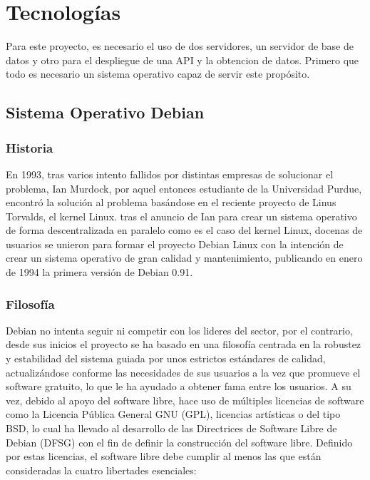 \chapter[Tecnologías]{Tecnologías}
\label{Chap3}

Para este proyecto, es necesario el uso de dos servidores, un servidor de base de datos y otro para el despliegue de una API y la obtencion de datos.\newline
\newline
Primero que todo es necesario un sistema operativo capaz de servir este propósito.

\section{Sistema Operativo Debian}

\subsection{Historia}
En 1993, tras varios intento fallidos por distintas empresas de solucionar el problema, Ian Murdock, por aquel entonces estudiante de la Universidad Purdue, encontró la solución al problema basándose en el reciente proyecto de Linus Torvalds, el kernel Linux. tras el anuncio de Ian para crear un sistema operativo de forma descentralizada en paralelo como es el caso del kernel Linux, docenas de usuarios se unieron para formar el proyecto Debian Linux con la intención de crear un sistema operativo de gran calidad y mantenimiento, publicando en enero de 1994 la primera versión de Debian 0.91. \cite{krafft2005debian} \cite{DebHis}

\subsection{Filosofía}
Debian no intenta seguir ni competir con los lideres del sector, por el contrario, desde sus inicios el proyecto se ha basado en una filosofía centrada en la robustez y estabilidad del sistema guiada por unos estrictos estándares de calidad, actualizándose conforme las necesidades de sus usuarios a la vez que promueve el software gratuito, lo que le ha ayudado a obtener fama entre los usuarios. \cite{DebFil} \cite{pollei2013debian}
\newline
\newline
A su vez, debido al apoyo del software libre, hace uso de múltiples licencias de software como la Licencia Pública General GNU (GPL), licencias artísticas o del tipo BSD, lo cual ha llevado al desarrollo de las Directrices de Software Libre de Debian (DFSG) con el fin de definir la construcción del software libre. \cite{DebFree}\newline
\newline
Definido por estas licencias, el software libre debe cumplir al menos las que están consideradas la cuatro libertades esenciales: \cite{GnuFS}

